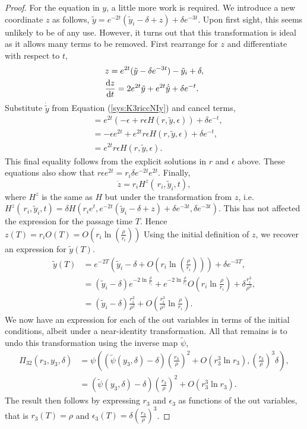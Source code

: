 \begin{proof}
	For the equation in $y$, a little more work is required. We introduce a new coordinate $z$ as follows, $\tilde{y}=e^{-2t}(\tilde{y}_i-\delta+z)+\delta  e^{-3t}$. Upon first sight, this seems unlikely to be of any use. However, it turns out that this transformation is ideal as it allows many terms to be removed. First rearrange for $z$ and differentiate with respect to $t$,
	\begin{align*}
	&z=e^{2t} (\tilde{y}-\delta e^{-3t})-\tilde{y}_i+\delta,\\
	&\od{z}{t}= 2e^{2t}\tilde{y}+e^{2t}\dot{\tilde{y}}+\delta e^{-t}.
	\end{align*}
	Substitute $\dot{\tilde{y}}$ from Equation (\ref{sys:K3riccNIy}) and cancel terms, 
	\begin{align*}
	&=e^{2t}(-\epsilon+r\epsilon H(r,\tilde{y},\epsilon))+\delta e^{-t},\\
	&=-\epsilon e^{2t}+e^{2t}r\epsilon  H(r,\tilde{y},\epsilon) + \delta e^{-t},\\
	&=e^{2t}r\epsilon  H(r,\tilde{y},\epsilon).
	\end{align*}
	This final equality follows from the explicit solutions in $r$ and $\epsilon$ above. These equations also show that $r\epsilon e^{2t} = r_i\delta e^{-2t}e^{2t}$. Finally,
	$$\dot{z} = r_iH^z(\,r_i,\tilde{y}_i,t),$$
	where $H^z$ is the same as $H$ but under the transformation from $z$, i.e. $H^z(\,r_i,\tilde{y}_i,t) = \delta H(r_ie^t,e^{-2t}(\tilde{y}_i-\delta+z)+\delta e^{-3t}, \delta e^{-3t})$. This has not affected the expression for the passage time $T$. Hence $z(T)=r_iO(T)=O(r_i\ln (\frac{\rho}{r_i}))$
	Using the initial definition of $z$, we recover an expression for $\tilde{y}(T)$.
	\begin{align*}
	\tilde{y}(T)&=e^{-2T}\left(\tilde{y}_i-\delta+O\left(r_i\ln\left(\frac{\rho}{r_i}\right)\right)\right)+\delta e^{-3T},\\
	&=(\tilde{y}_i-\delta)e^{-2\ln\frac{\rho}{r_i}}+e^{-2\ln\frac{\rho}{r_i}}O\left(r_i\ln\frac{\rho}{r_i}\right)+\delta \frac{r_i^3}{\rho^3},\\
	&=(\tilde{y}_i-\delta)\frac{r_i^2}{\rho^2}+O\left(\frac{r_i^3}{\rho^2}\ln\frac{\rho}{r_i}\right).
	\end{align*}
	We now have an expression for each of the out variables in terms of the initial conditions, albeit under a near-identity transformation. All that remains is to undo this transformation using the inverse map $\tilde{\psi}$,	\begin{align*}
	\Pi_{32}(r_3,y_3,\delta) &= \psi \left( \left( \tilde{\psi}(y_3,\delta)-\delta\right)\left(\frac{r_3}{\rho}\right)^2 + O(r_3^3\ln r_3), \left(\frac{r_3}{\rho}\right)^3\delta\right),\\
	&=(\tilde{\psi}(y_3,\delta)-\delta)\left( \frac{r_3}{\rho}\right)^2 +O(r_3^3\ln r_3).
	\end{align*}
	The result then follows by expressing $r_3$ and $\epsilon_3$ as functions of the out variables, that is $r_3(T)=\rho$ and $\epsilon_3(T)=\delta\left(\frac{r_3}{\rho}\right)^3$.
\end{proof}

